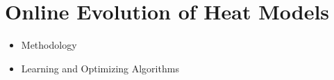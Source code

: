 
\chapter{Online Evolution of Heat Models}
\label{ch:onlineevo}

\begin{itemize}
\item{Methodology}
\item{Learning and Optimizing Algorithms}
\end{itemize}